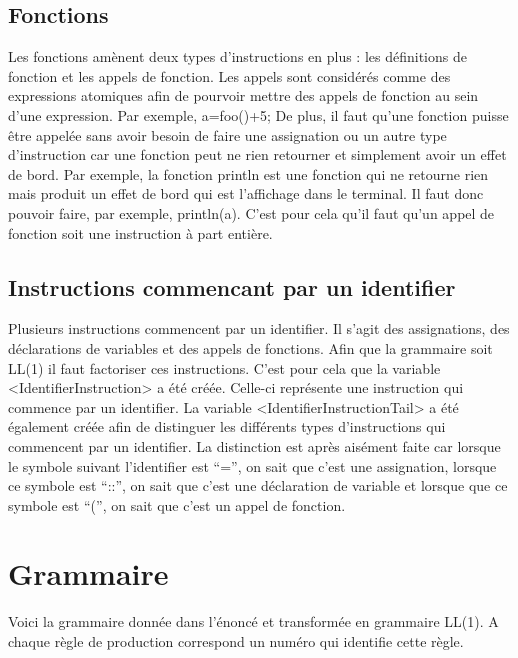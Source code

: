 \documentclass[a4paper,10pt]{article}
\begin{document}
\subsection{Fonctions}
Les fonctions amènent deux types d'instructions en plus : les définitions de fonction et les appels de fonction. Les appels sont considérés comme des expressions atomiques afin de pourvoir mettre des appels de fonction au sein d'une expression. Par exemple, a=foo()+5;
De plus, il faut qu'une fonction puisse être appelée sans avoir besoin de faire une assignation ou un autre type d'instruction car une fonction peut ne rien retourner et simplement avoir un effet de bord. Par exemple, la fonction println est une fonction qui ne retourne rien mais produit un effet de bord qui est l'affichage dans le terminal. Il faut donc pouvoir faire, par exemple, println(a). C'est pour cela qu'il faut qu'un appel de fonction soit une instruction à part entière.
\subsection{Instructions commencant par un identifier}
Plusieurs instructions commencent par un identifier. Il s'agit des assignations, des déclarations de variables et des appels de fonctions. Afin que la grammaire soit LL(1) il faut factoriser ces instructions. C'est pour cela que la variable <IdentifierInstruction> a été créée. Celle-ci représente une instruction qui commence par un identifier. La variable <IdentifierInstructionTail> a été également créée afin de distinguer les différents types d'instructions qui commencent par un identifier. La distinction est après aisément faite car lorsque le symbole suivant l'identifier est ``='', on sait que c'est une assignation, lorsque ce symbole est ``::'', on sait que c'est une déclaration de variable et lorsque que ce symbole est ``('', on sait que c'est un appel de fonction.


\section{Grammaire}

Voici la grammaire donnée dans l'énoncé et transformée en grammaire LL(1). A chaque règle de production correspond un numéro qui identifie cette règle.
\end{document}
